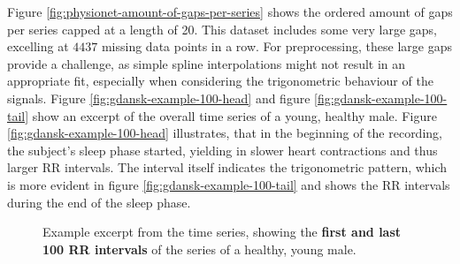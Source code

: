\documentclass[11pt]{scrartcl}
\begin{document}
Figure \ref{fig:physionet-amount-of-gaps-per-series} shows the ordered amount of gaps per series capped at a length of 20. This dataset includes some very large gaps, excelling at $4437$ missing data points in a row. For preprocessing, these large gaps provide a challenge, as simple spline interpolations might not result in an appropriate fit, especially when considering the trigonometric behaviour of the signals. Figure \ref{fig:gdansk-example-100-head} and figure \ref{fig:gdansk-example-100-tail} show an excerpt of the overall time series of a young, healthy male. Figure \ref{fig:gdansk-example-100-head} illustrates, that in the beginning of the recording, the subject's sleep phase started, yielding in slower heart contractions and thus larger RR intervals. The interval itself indicates the trigonometric pattern, which is more evident in figure \ref{fig:gdansk-example-100-tail} and shows the RR intervals during the end of the sleep phase.

\begin{figure}[hbt]
	\caption{Example excerpt from the time series, showing the \textcolor{viridis5}{\textbf{first and last 100 RR intervals}} of the series of a healthy, young male.}
\end{figure}
\end{document}
